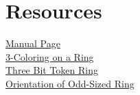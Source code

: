 
\section{Resources}
\href{man.html}{Manual Page}
\\\href{example/ColorRing.html}{3-Coloring on a Ring}
\\\href{example/TokenRingThreeBit.html}{Three Bit Token Ring}
\\\href{example/OrientOddRing.html}{Orientation of Odd-Sized Ring}





